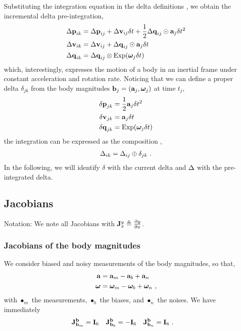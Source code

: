 Substituting the integration equation  in the delta definitions , we obtain the incremental delta pre-integration,
%
\begin{align}\label{equ:g_second_order_pre-integration}
\begin{split}
{\Delta{\bf p}}_{ik} 
&= {\Delta{\bf p}}_{ij} + {\Delta{\bf v}}_{ij}\delta t + \frac12{\Delta{\bf q}}_{ij}\odot{\bf a}_j\delta t^2 \\
{\Delta{\bf v}}_{ik} 
&= {\Delta{\bf v}}_{ij} + {\Delta{\bf q}}_{ij}\odot{\bf a}_j\delta t \\
{\Delta{\bf q}}_{ik} 
&= {\Delta{\bf q}}_{ij}\otimes\operatorname*{Exp}({{\bm \omega}}_j\delta t) 
\end{split}
\end{align}
%
which, interestingly, expresses the motion of a body in an inertial frame under constant acceleration and rotation rate.
Noticing that we can define a proper delta $\delta_{jk}$ from the body magnitudes ${\bf b}_j=({\bf a}_j,{{\bm \omega}}_j)$ at time $t_j$,
%
\begin{align}\label{equ:delta_creation}
\begin{split}
{\delta{\bf p}}_{jk} &= \frac12{\bf a}_j\delta t^2 \\
{\delta{\bf v}}_{jk} &= {\bf a}_j\delta t \\
{\delta{\bf q}}_{jk} &= \operatorname*{Exp}({{\bm \omega}}_j\delta t)
\end{split}
\end{align}
%
the integration  can be expressed as the composition , 
%
\begin{align}\label{equ:composition_compact}
\Delta_{ik}=\Delta_{ij}\oplus\delta_{jk}
~.
\end{align}
%
In the following, we will identify $\delta$ with the current delta and $\Delta$ with the pre-integrated delta.


\subsection{Jacobians}

\newcommand{\jac}[2]{{\bfJ^{#1}_{#2}}}

Notation: 
We note all Jacobians with $\jac{y}{x}\te\dpar{y}{x}$. 



\subsubsection{Jacobians of the body magnitudes}

We consider biased and noisy measurements of the body magnitudes, so that,
%
\begin{align}
\begin{split}
{\bf a} &= {\bf a}_m - {{\bf a}_b} + {\bf a}_n \\
{{\bm \omega}} &= {{\bm \omega}}_m - {{{\bm \omega}}_b} + {{\bm \omega}}_n 
~,
\end{split}
\end{align}
%
with $\bullet_m$ the measurements, $\bullet_b$ the biases, and $\bullet_n$ the noises.
We have immediately
%
\begin{align}
\jac{\bfb}{\bfb_m}&=\bfI_6 & \jac{\bfb}{\bfb_b}&=-\bfI_6 & \jac{\bfb}{\bfb_n}&=\bfI_6
~.
\end{align}

